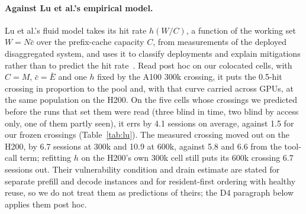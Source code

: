 \paragraph{Against Lu et al.'s empirical model.} Lu et al.'s fluid model takes its hit rate $h(W/C)$, a function of the working set
$W=N\bar c$ over the prefix-cache capacity $C$, from measurements of the deployed disaggregated system, and uses it to classify
deployments and explain mitigations rather than to predict the hit rate~\citep{lu2026cachetrap}. Read post hoc on our colocated
cells, with $C=M$, $\bar c=\bar E$ and one $h$ fixed by the A100 300k crossing, it puts the 0.5-hit crossing in proportion to the pool
and, with that curve carried across GPUs, at the same population on the H200. On the five cells whose crossings we predicted
before the runs that set them were read (three blind in time, two blind by access only, one of them partly seen), it errs by 4.1 sessions on average, against 1.5 for our
frozen crossings (Table~\ref{tab:lu}). The measured crossing moved out on the H200, by 6.7 sessions at 300k and 10.9 at 600k, against
5.8 and 6.6 from the tool-call term; refitting $h$ on the H200's own 300k cell still puts its 600k crossing 6.7 sessions out. Their
vulnerability condition and drain estimate are stated for separate prefill and decode instances and for resident-first ordering
with healthy reuse, so we do not treat them as predictions of theirs; the D4 paragraph below applies them post hoc.

